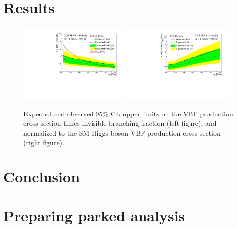 \section{Results}


\begin{figure}[htp]
\centering
\includegraphics[width=0.49\textwidth]{Chapter05/Images/vbfxslimit.pdf}
\includegraphics[width=0.49\textwidth]{Chapter05/Images/vbflimit.pdf}
\caption{Expected and observed 95\% CL upper limits on the VBF production cross section times invisible branching fraction (left figure), and normalized to the \gls{SM} Higgs boson \gls{VBF} production cross section (right figure). \cite{ARTICLE:CMSVBFHiggsToInvAndZHCombination}}
\label{FIGURE:vbfLimit}
\end{figure}


\section{Conclusion}



\section{Preparing parked analysis}



